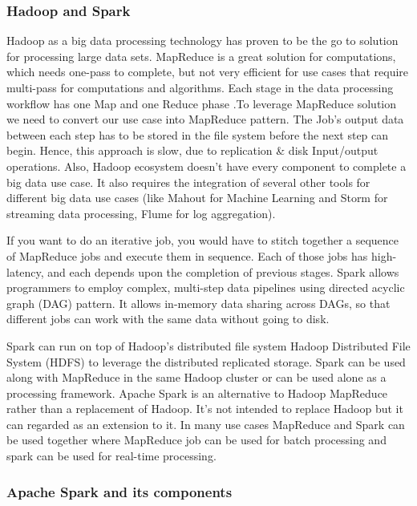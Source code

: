\subsubsection{Hadoop and Spark}
Hadoop as a big data processing technology has proven to be the go to solution for processing large data sets. MapReduce is a great solution for computations, which needs one-pass to complete, but not very efficient for use cases that require multi-pass for computations and algorithms. Each stage in the data processing workflow has one Map and one Reduce phase .To leverage MapReduce solution we need to convert our use case into MapReduce pattern. The Job's output data between each step has to be stored in the file system before the next step can begin. Hence, this approach is slow, due to replication \& disk Input/output operations. Also, Hadoop ecosystem doesn’t have every component to complete a big data use case. It also requires the integration of several other tools for different big data use cases (like Mahout for Machine Learning and Storm for streaming data processing, Flume for log aggregation).

If you want to do an iterative job, you would have to stitch together a sequence of MapReduce jobs and execute them in sequence. Each of those jobs has high-latency, and each depends upon the completion of previous stages. Spark allows programmers to employ complex, multi-step data pipelines using directed acyclic graph (DAG) pattern. It allows in-memory data sharing across DAGs, so that different jobs can work with the same data without going to disk.

Spark can run on top of Hadoop’s distributed file system Hadoop Distributed File System (HDFS) to leverage the distributed replicated storage. Spark can be used along with MapReduce in the same Hadoop cluster or can be used alone as a processing framework. Apache Spark is an alternative to Hadoop MapReduce rather than a replacement of Hadoop. It’s not intended to replace Hadoop but it can regarded as an extension to it. In many use cases MapReduce and Spark can be used together where MapReduce job can be used for batch processing and spark can be used for real-time processing.

\subsubsection{Apache Spark and its components}

